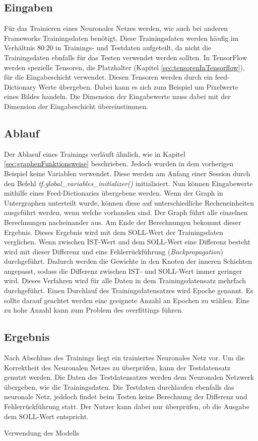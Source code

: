 \subsection{Eingaben}
\label{sec:eingaben}
Für das Trainieren eines Neuronales Netzes werden, wie auch bei anderen Frameworks Trainingsdaten benötigt. Diese Trainingsdaten werden häufig im Verhältnis 80:20 in Trainings- und Testdaten aufgeteilt, da nicht die Trainingsdaten ebnfalls für das Testen verwendet werden sollten. In TensorFlow werden spezielle Tensoren, die Platzhalter (Kapitel \ref{sec:tensorenInTensorflow}), für die Eingabeschicht verwendet. Diesen Tensoren werden durch ein feed-Dictionary Werte übergeben. Dabei kann es sich zum Beispiel um Pixelwerte eines Bildes handeln. Die Dimension der Eingabewerte muss dabei mit der Dimension der Eingabeschicht übereinstimmen. 

\subsection{Ablauf}
\label{sec:ablauf}
Der Ablasuf eines Trainings verläuft ähnlich, wie in Kapitel \ref{sec:graphenFunktionsweise} beschrieben. Jedoch wurden in dem vorherigen Beispiel keine Variablen verwendet. Diese werden am Anfang einer Session durch den Befehl \textit{tf.global\_variables\_initializer()} initialisiert. Nun können Eingabewerte mithilfe eines Feed-Dictionaries übergebene werden. Wenn der Graph in Untergraphen unterteilt wurde, können diese auf unterschiedliche Recheneinheiten ausgeführt werden, wenn welche vorhanden sind. Der Graph führt alle einzelnen Berechnungen nacheinander aus. Am Ende der Berechnungen bekommt dieser Ergebnis. Dieses Ergebnis wird mit dem SOLL-Wert der Trainingsdaten verglichen. Wenn zwischen IST-Wert und dem SOLL-Wert eine Differenz besteht wird mit dieser Differenz und eine Fehlerrückführung (\textit{Backpropagation}) durchgeführt. Dadurch werden die Gewichte in den Knoten der inneren Schichten angepasst, sodass die Differenz zwischen IST- und SOLL-Wert immer geringer wird. Dieses Verfahren wird für alle Daten in dem Trainingsdatensatz mehrfach durchgeführt. Einen Durchlauf des Trainingsdatensatzes wird Epoche genannt. Es sollte darauf geachtet werden eine geeignete Anzahl an Epochen zu wählen. Eine zu hohe Anzahl kann zum Problem des overfittings führen.

\subsection{Ergebnis}
\label{sec:ergebnis}
Nach Abschluss des Trainings liegt ein trainiertes Neuronales Netz vor. Um die Korrektheit des Neuronalen Netzes zu überprüfen, kann der Testdatensatz genutzt werden. Die Daten des Testdatensatzes werden dem Neuronalen Netzwerk übergeben, wie die Trainingsdaten. Die Testdaten durchlaufen ebenfalls das neuronale Netz, jeddoch findet beim Testen keine Berechnung der Differenz und Fehlerrückführung statt. Der Nutzer kann dabei nur überprüfen, ob die Ausgabe dem SOLL-Wert entspricht. 

Verwendung des Modells

